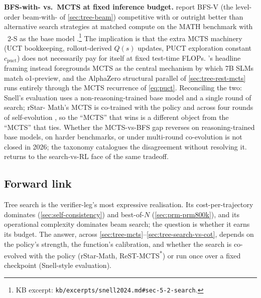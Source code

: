 \begin{contradiction}
\textbf{BFS-with- vs.\ MCTS at fixed inference budget.}
\citet[\S 5--6]{snell2024} report BFS-V (the level-order
beam-with- of \cref{sec:tree-beam}) competitive with or outright
better than alternative search strategies at matched compute on the
MATH benchmark with ~2-S\* as the base model
\citep[\S 5.2]{snell2024}.\footnote{KB excerpt:
\nolinkurl{kb/excerpts/snell2024.md#sec-5-2-search}.} The implication
is that the extra MCTS machinery (UCT bookkeeping, rollout-derived
$Q(s)$ updates, PUCT exploration constant $c_\text{puct}$) does not
necessarily pay for itself at fixed test-time FLOPs. \citet{rstar-math2025}'s
headline framing instead foregrounds MCTS as the central mechanism by
which 7B SLMs match o1-preview, and the AlphaZero structural parallel
of \cref{sec:tree-rest-mcts} runs entirely through the MCTS recurrence
of \cref{eq:puct}. Reconciling the two: Snell's evaluation uses a
non-reasoning-trained base model and a single round of search; rStar-
Math's MCTS is co-trained with the policy and  across four rounds
of self-evolution \citep[abstract]{rstar-math2025}, so the
``MCTS'' that wins is a different object from the
``MCTS'' that ties. Whether the MCTS-vs-BFS gap reverses on
reasoning-trained base models, on harder benchmarks, or under
multi-round co-evolution is not closed in 2026; the
\citet{wei2025-tree-search-survey} taxonomy
catalogues the disagreement without resolving
it.  returns to the
search-vs-RL face of the same tradeoff.
\end{contradiction}

\subsection{Forward link}
\label{sec:tree-forward}

Tree search is the verifier-leg's most expressive realisation. Its
cost-per-trajectory dominates 
(\cref{sec:self-consistency}) and best-of-$N$
(\cref{sec:prm-prm800k}), and its operational complexity dominates
beam search; the question is whether it earns its budget. The answer,
across \cref{sec:tree-mcts}--\cref{sec:tree-search-vs-cot}, depends
on the policy's strength, the  function's calibration, and
whether the search is co-evolved with the policy
(rStar-Math, ReST-MCTS\textsuperscript{*}) or run once over a fixed
checkpoint (Snell-style evaluation).

